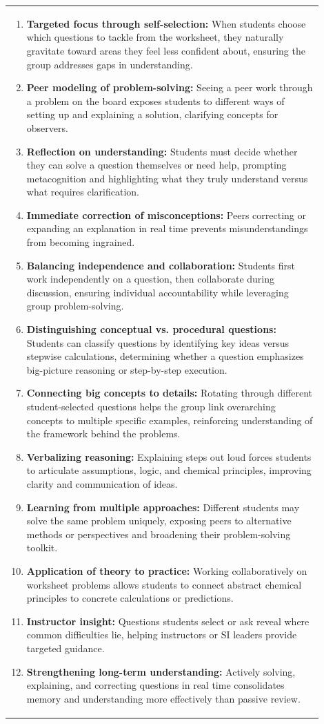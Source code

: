 \documentclass{article}
\begin{document}
{\begin{tabular}{|p{0.9\linewidth}|}
\begin{enumerate}
    \item \textbf{Targeted focus through self-selection:} When students choose which questions to tackle from the worksheet, they naturally gravitate toward areas they feel less confident about, ensuring the group addresses gaps in understanding.
    \item \textbf{Peer modeling of problem-solving:} Seeing a peer work through a problem on the board exposes students to different ways of setting up and explaining a solution, clarifying concepts for observers.
    \item \textbf{Reflection on understanding:} Students must decide whether they can solve a question themselves or need help, prompting metacognition and highlighting what they truly understand versus what requires clarification.
    \item \textbf{Immediate correction of misconceptions:} Peers correcting or expanding an explanation in real time prevents misunderstandings from becoming ingrained.
    \item \textbf{Balancing independence and collaboration:} Students first work independently on a question, then collaborate during discussion, ensuring individual accountability while leveraging group problem-solving.
    \item \textbf{Distinguishing conceptual vs. procedural questions:} Students can classify questions by identifying key ideas versus stepwise calculations, determining whether a question emphasizes big-picture reasoning or step-by-step execution.
    \item \textbf{Connecting big concepts to details:} Rotating through different student-selected questions helps the group link overarching concepts to multiple specific examples, reinforcing understanding of the framework behind the problems.
    \item \textbf{Verbalizing reasoning:} Explaining steps out loud forces students to articulate assumptions, logic, and chemical principles, improving clarity and communication of ideas.
    \item \textbf{Learning from multiple approaches:} Different students may solve the same problem uniquely, exposing peers to alternative methods or perspectives and broadening their problem-solving toolkit.
    \item \textbf{Application of theory to practice:} Working collaboratively on worksheet problems allows students to connect abstract chemical principles to concrete calculations or predictions.
    \item \textbf{Instructor insight:} Questions students select or ask reveal where common difficulties lie, helping instructors or SI leaders provide targeted guidance.
    \item \textbf{Strengthening long-term understanding:} Actively solving, explaining, and correcting questions in real time consolidates memory and understanding more effectively than passive review.
\end{enumerate}
\hline
\end{tabular}

}
\end{document}
